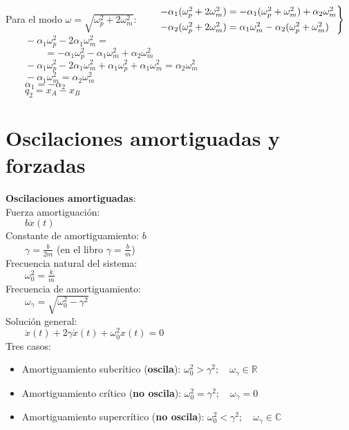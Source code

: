 \documentclass[a4paper,landscape,10pt]{cheatsheet}
\begin{document}
Para el modo $\omega=\sqrt{\omega_p^2+2\omega_m^2}$:
$\qquad \begin{rcases}
    -\alpha_1(\omega_p^2+2\omega_m^2)=-\alpha_1(\omega_p^2+\omega_m^2)+\alpha_2\omega_m^2 \\
    -\alpha_2(\omega_p^2+2\omega_m^2)=\alpha_1\omega_m^2-\alpha_2(\omega_p^2+\omega_m^2)  \\
  \end{rcases}
$\\
$\qquad -\alpha_1\omega_p^2-2\alpha_1\omega_m^2=$\\
$\qquad\qquad =-\alpha_1\omega_p^2-\alpha_1\omega_m^2+\alpha_2\omega_m^2$\\
$\qquad -\alpha_1\omega_p^2-2\alpha_1\omega_m^2+\alpha_1\omega_p^2+\alpha_1\omega_m^2=\alpha_2\omega_m^2$\\
$\qquad -\alpha_1\omega_m^2=\alpha_2\omega_m^2$\\
$\qquad \alpha_1=-\alpha_2$\\
$\qquad q_2=x_A-x_B$\\

\section{Oscilaciones amortiguadas y forzadas}
\textbf{Oscilaciones amortiguadas}:\\
Fuerza amortiguación:\\
$\qquad b\dot{x}(t)$\\
Constante de amortiguamiento: $b$\\
$\qquad \gamma = \frac{b}{2m}$ (en el libro $\gamma = \frac{b}{m}$)\\
Frecuencia natural del sistema:\\
$\qquad \omega_0^2 = \frac{k}{m}$\\
Frecuencia de amortiguamiento:\\
$\qquad \omega_\gamma = \sqrt{\omega_0^2-\gamma^2}$\\
Solución general:\\
$\qquad \ddot{x}(t) + 2\gamma\dot{x}(t) + \omega_0^2x(t) = 0$\\
Tres casos:\\
\begin{itemize}
  \item Amortiguamiento subcrítico (\textbf{oscila}): $\omega_0^2>\gamma^2;\quad\omega_\gamma\in\mathbb{R}$
  \item Amortiguamiento crítico (\textbf{no oscila}): $\omega_0^2=\gamma^2;\quad\omega_\gamma=0$
  \item Amortiguamiento supercrítico (\textbf{no oscila}): $\omega_0^2<\gamma^2;\quad\omega_\gamma\in\mathbb{C}$
\end{itemize}
\end{document}
